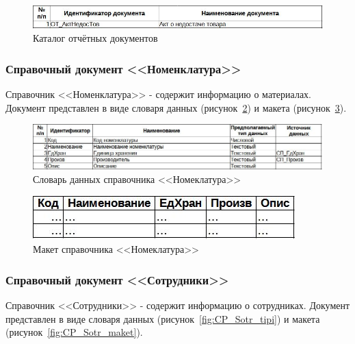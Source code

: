 \begin{figure}[!h]
    \centering
    \includegraphics[width=14cm]
        {_docs/ОТ_каталог.jpg}
    \caption{Каталог отчётных документов}
    \label{fig:OT_katalog}
\end{figure}

\newpage

\subsubsection{Справочный документ <<Номенклатура>>}

Справочник <<Номенклатура>> - содержит информацию о материалах.
Документ представлен в виде словаря данных (рисунок~\ref{fig:CP_Nomenkl_tipi})
и макета (рисунок~\ref{fig:CP_Nomenkl_maket}).

\begin{figure}[!h]
    \centering
    \includegraphics[width=14cm]
        {_docs/СП_Номенкл_типы.jpg}
    \caption{Словарь данных справочника <<Номеклатура>>}
    \label{fig:CP_Nomenkl_tipi}
\end{figure}

\begin{figure}[!h]
    \centering
    \includegraphics[]
        {_docs/СП_Номенкл_макет.jpg}
    \caption{Макет справочника <<Номеклатура>>}
    \label{fig:CP_Nomenkl_maket}
\end{figure}

\subsubsection{Справочный документ <<Сотрудники>>}

Справочник <<Сотрудники>> - содержит информацию о сотрудниках.
Документ представлен в виде словаря данных (рисунок~\ref{fig:CP_Sotr_tipi})
и макета (рисунок~\ref{fig:CP_Sotr_maket}).

